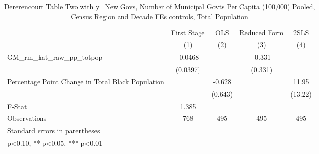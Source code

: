 \begin{table}[htbp]\centering
\def\sym#1{\ifmmode^{#1}\else\(^{#1}\)\fi}
\caption{Dererencourt Table Two with y=New Govs, Number of Municipal Govts Per Capita (100,000) Pooled, Census Region and Decade FEs controls, Total Population}
\begin{tabular}{l*{4}{c}}
\toprule
                    & First Stage   &         OLS   &Reduced Form   &        2SLS   \\
                    &\multicolumn{1}{c}{(1)}   &\multicolumn{1}{c}{(2)}   &\multicolumn{1}{c}{(3)}   &\multicolumn{1}{c}{(4)}   \\
\midrule
GM\_rm\_hat\_raw\_pp\_totpop&     -0.0468   &               &      -0.331   &               \\
                    &    (0.0397)   &               &     (0.331)   &               \\
\addlinespace
Percentage Point Change in Total Black Population&               &      -0.628   &               &       11.95   \\
                    &               &     (0.643)   &               &     (13.22)   \\
\midrule
F-Stat              &       1.385   &               &               &               \\
Observations        &         768   &         495   &         495   &         495   \\
\bottomrule
\multicolumn{5}{l}{\footnotesize Standard errors in parentheses}\\
\multicolumn{5}{l}{\footnotesize * p<0.10, ** p<0.05, *** p<0.01}\\
\end{tabular}
\end{table}
